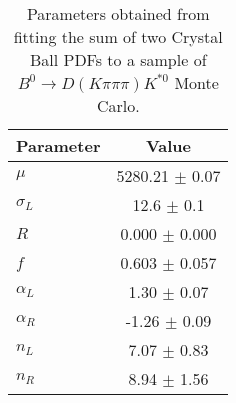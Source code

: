 \begin{table}[h]
  \centering
  \begin{tabular}{lc}
      \toprule
      Parameter & Value \\
      \midrule
      $\mu$ & 5280.21 $\pm$ 0.07 \\
      $\sigma_L$ & 12.6 $\pm$ 0.1 \\
      $R$ & 0.000 $\pm$ 0.000 \\
      $f$ & 0.603 $\pm$ 0.057 \\
      $\alpha_L$ & 1.30 $\pm$ 0.07 \\
      $\alpha_R$ & -1.26 $\pm$ 0.09 \\
      $n_L$ & 7.07 $\pm$ 0.83 \\
      $n_R$ & 8.94 $\pm$ 1.56 \\
  \bottomrule
  \end{tabular}
  \caption{Parameters obtained from fitting the sum of two Crystal Ball PDFs to a sample of $B^0 \to D(K\pi\pi\pi)K^{*0}$ Monte Carlo.}
\label{tab:signal_Kpipipi_MC_params}
\end{table}
